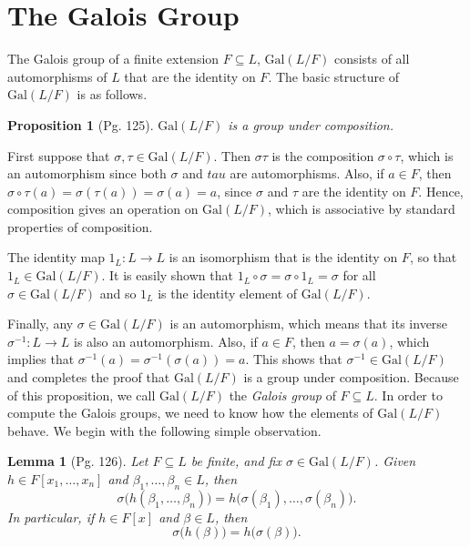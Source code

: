 \documentclass[leqno]{article}
\makeatletter
\newtheorem{lemma}{Lemma}
\theoremstyle{definition}
\newtheorem{prop}{Proposition}
\theoremstyle{remark}
\let\oldproofname=\proofname
\renewcommand{\proofname}{\textit{\oldproofname}}
\theoremstyle{definition}
\renewenvironment{proof}[1][\proofname]{\par
  \pushQED{\qed}%
  \normalfont \topsep6\p@\@plus6\p@\relax
  \list{}{\leftmargin=0mm
          \rightmargin=0mm
          \settowidth{\itemindent}{\itshape#1}%
          \labelwidth=\itemindent
          \parsep=0pt \listparindent=0mm%
  }
  \item[\hskip\labelsep
        \itshape
    #1\@addpunct{.}]\ignorespaces
}{%
  \popQED\endlist\@endpefalse
}
\makeatother
\begin{document}
\section{The Galois Group}
    The Galois group of a finite extension $F\subseteq L$, $\text{Gal}(L/F)$ consists of all automorphisms of $L$ that are the identity on $F$. The basic structure of $\text{Gal}(L/F)$ is as follows.
    \begin{prop}[Pg. 125]\label{prop:4}
        \textit{$\text{Gal}(L/F)$ is a group under composition.}
    \end{prop}
        \begin{proof}
            First suppose that $\sigma,\tau\in\text{Gal}(L/F)$. Then $\sigma\tau$ is the composition $\sigma\circ\tau$, which is an automorphism since both $\sigma$ and $tau$ are automorphisms. Also, if $a\in F$, then $\sigma\circ\tau(a)=\sigma(\tau(a))=\sigma(a)=a$, since $\sigma$ and $\tau$ are the identity on $F$. Hence, composition gives an operation on $\text{Gal}(L/F)$, which is associative by standard properties of composition.\par\hspace{4mm} The identity map $1_L\colon L\rightarrow L$ is an isomorphism that is the identity on $F$, so that $1_L\in\text{Gal}(L/F)$. It is easily shown that $1_L\circ\sigma=\sigma\circ 1_L=\sigma$ for all $\sigma\in\text{Gal}(L/F)$ and so $1_L$ is the identity element of $\text{Gal}(L/F)$.\par\hspace{4mm} Finally, any $\sigma\in\text{Gal}(L/F)$ is an automorphism, which means that its inverse $\sigma^{-1}\colon L\rightarrow L$ is also an automorphism. Also, if $a\in F$, then $a=\sigma(a)$, which implies that $\sigma^{-1}(a)=\sigma^{-1}(\sigma(a))=a$. This shows that $\sigma^{-1}\in\text{Gal}(L/F)$ and completes the proof that $\text{Gal}(L/F)$ is a group under composition.
        \end{proof}
    Because of this proposition, we call $\text{Gal}(L/F)$ the \textit{Galois group} of $F\subseteq L$. In order to compute the Galois groups, we need to know how the elements of $\text{Gal}(L/F)$ behave. We begin with the following simple observation.
    \begin{lemma}[Pg. 126]\label{lem:13}
        Let $F\subseteq L$ be finite, and fix $\sigma\in\text{Gal}(L/F)$. Given $h\in F[x_1,\dots,x_n]$ and $\beta_1,\dots,\beta_n\in L$, then 
            \begin{equation*}
                \sigma\big(h(\beta_1,\dots,\beta_n)\big)=h\big(\sigma(\beta_1),\dots,\sigma(\beta_n)\big).
            \end{equation*}
        In particular, if $h\in F[x]$ and $\beta\in L$, then 
            \begin{equation*}
                \sigma\big(h(\beta)\big)=h\big(\sigma(\beta)\big).
            \end{equation*}
    \end{lemma}
\end{document}
